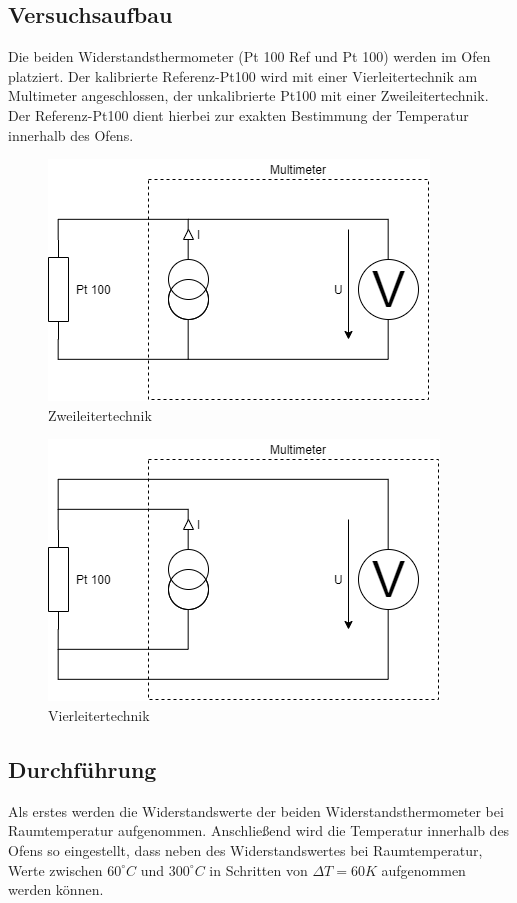 \documentclass[a4paper,11pt,oneside]{article}
\begin{document}
\subsection{Versuchsaufbau}
Die beiden Widerstandsthermometer (Pt 100 Ref und Pt 100) werden im Ofen platziert. Der kalibrierte Referenz-Pt100 wird mit einer Vierleitertechnik am Multimeter angeschlossen, der unkalibrierte Pt100 mit einer Zweileitertechnik. \\ 
Der Referenz-Pt100 dient hierbei zur exakten Bestimmung der Temperatur innerhalb des Ofens.

\begin{figure}[h]
\centering
\includegraphics[scale=0.5]{Bilder/Aufg1Schaltbild1.png}
\caption{Zweileitertechnik}
\end{figure}

\begin{figure}[h]
\centering
\includegraphics[scale=0.5]{Bilder/Aufg1Schaltbild2.png}
\caption{Vierleitertechnik}
\end{figure}



\newpage
\subsection{Durchführung}
Als erstes werden die Widerstandswerte der beiden Widerstandsthermometer bei Raumtemperatur aufgenommen. Anschließend wird die Temperatur innerhalb des Ofens so eingestellt, dass neben des Widerstandswertes bei Raumtemperatur, Werte zwischen $60^\circ C$ und  $300^\circ C$ in Schritten von $\Delta T = 60K$ aufgenommen werden können. 
\end{document}
